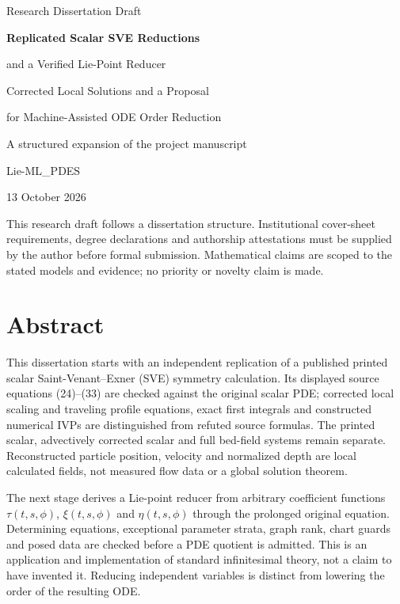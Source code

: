 \documentclass[12pt,a4paper,oneside]{report}
\numberwithin{equation}{chapter}
\begin{document}
\begin{titlepage}
\centering
\vspace*{22mm}
{\Large Research Dissertation Draft\par}
\vspace{20mm}
{\LARGE\bfseries Replicated Scalar SVE Reductions\par
and a Verified Lie-Point Reducer\par}
\vspace{12mm}
{\Large Corrected Local Solutions and a Proposal\par
for Machine-Assisted ODE Order Reduction\par}
\vfill
{\large A structured expansion of the project manuscript\par}
\vspace{6mm}
{\large Lie-ML\_PDES\par}
\vspace{12mm}
{\large 13 October 2026\par}
\vspace{10mm}
\begin{minipage}{.8\textwidth}\small
This research draft follows a dissertation structure. Institutional cover-sheet
requirements, degree declarations and authorship attestations must be supplied
by the author before formal submission. Mathematical claims are scoped to the
stated models and evidence; no priority or novelty claim is made.
\end{minipage}
\end{titlepage}
\chapter*{Abstract}
This dissertation starts with an independent replication of a published
printed scalar Saint-Venant--Exner (SVE) symmetry calculation. Its displayed
source equations (24)--(33) are checked against the original scalar PDE;
corrected local scaling and traveling profile equations, exact first
integrals and constructed numerical IVPs are distinguished from refuted
source formulas. The printed scalar, advectively corrected scalar and full
bed-field systems remain separate. Reconstructed particle position,
velocity and normalized depth are local calculated fields, not measured
flow data or a global solution theorem.

The next stage derives a Lie-point reducer from arbitrary coefficient
functions $\tau(t,s,\phi)$, $\xi(t,s,\phi)$ and $\eta(t,s,\phi)$ through the
prolonged original equation. Determining equations, exceptional parameter
strata, graph rank, chart guards and posed data are checked before a PDE
quotient is admitted. This is an application and implementation of standard
infinitesimal theory, not a claim to have invented it. Reducing independent
variables is distinct from lowering the order of the resulting ODE.
\end{document}
